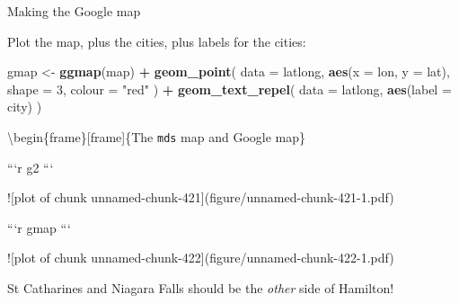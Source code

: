 \documentclass[ignorenonframetext,]{beamer}
\newenvironment{Shaded}{\begin{snugshade}}{\end{snugshade}}
\newcommand{\DataTypeTok}[1]{\textcolor[rgb]{0.13,0.29,0.53}{#1}}
\newcommand{\DecValTok}[1]{\textcolor[rgb]{0.00,0.00,0.81}{#1}}
\newcommand{\KeywordTok}[1]{\textcolor[rgb]{0.13,0.29,0.53}{\textbf{#1}}}
\newcommand{\NormalTok}[1]{#1}
\newcommand{\OperatorTok}[1]{\textcolor[rgb]{0.81,0.36,0.00}{\textbf{#1}}}
\newcommand{\StringTok}[1]{\textcolor[rgb]{0.31,0.60,0.02}{#1}}
\begin{document}
\begin{frame}[fragile]{Making the Google map}
\protect\hypertarget{making-the-google-map}{}

Plot the map, plus the cities, plus labels for the cities:

\begin{Shaded}
\begin{Highlighting}[]
\NormalTok{gmap <-}\StringTok{ }\KeywordTok{ggmap}\NormalTok{(map) }\OperatorTok{+}
\StringTok{  }\KeywordTok{geom_point}\NormalTok{(}
    \DataTypeTok{data =}\NormalTok{ latlong,}
    \KeywordTok{aes}\NormalTok{(}\DataTypeTok{x =}\NormalTok{ lon, }\DataTypeTok{y =}\NormalTok{ lat),}
    \DataTypeTok{shape =} \DecValTok{3}\NormalTok{, }\DataTypeTok{colour =} \StringTok{"red"}
\NormalTok{  ) }\OperatorTok{+}
\StringTok{  }\KeywordTok{geom_text_repel}\NormalTok{(}
    \DataTypeTok{data =}\NormalTok{ latlong,}
    \KeywordTok{aes}\NormalTok{(}\DataTypeTok{label =}\NormalTok{ city)}
\NormalTok{  )}
\end{Highlighting}
\end{Shaded}

\textbackslash{}begin\{frame\}{[}frame{]}\{The \texttt{mds} map and
Google map\}

\begin{multicols}{2}

```r
g2
```

![plot of chunk unnamed-chunk-421](figure/unnamed-chunk-421-1.pdf)

     


```r
gmap
```

![plot of chunk unnamed-chunk-422](figure/unnamed-chunk-422-1.pdf)

 
\end{multicols}

St Catharines and Niagara Falls should be the \emph{other} side of
Hamilton!

\end{frame}
\end{document}
